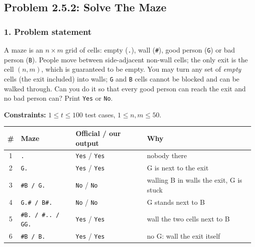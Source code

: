 \subsection{Problem 2.5.2: Solve The Maze}

\newcommand{\gptworow}[2]{\foreach \s/\t [count=\c from 0] in {#2} \node[g2p5-\s] at (\c,-#1) {\t};}


\subsubsection*{1. Problem statement}

A maze is an $n \times m$ grid of cells: empty (\texttt{.}), wall (\texttt{\#}), good person (\texttt{G}) or bad person (\texttt{B}). People move between side-adjacent non-wall cells; the only exit is the cell $(n, m)$, which is guaranteed to be empty. You may turn any set of \emph{empty} cells (the exit included) into walls; \texttt{G} and \texttt{B} cells cannot be blocked and can be walked through. Can you do it so that every good person can reach the exit and no bad person can? Print \texttt{Yes} or \texttt{No}.

\textbf{Constraints:} $1 \le t \le 100$ test cases, $1 \le n, m \le 50$.

\begin{table}[H]
\centering\small
\begin{tabular}{@{}clll@{}}
\toprule
\textbf{\#} & \textbf{Maze} & \textbf{Official / our output} & \textbf{Why} \\
\midrule
1 & \texttt{.} & \texttt{Yes} / \texttt{Yes} & nobody there \\
2 & \texttt{G.} & \texttt{Yes} / \texttt{Yes} & G is next to the exit \\
3 & \texttt{\#B / G.} & \texttt{No} / \texttt{No} & walling B in walls the exit, G is stuck \\
4 & \texttt{G.\# / B\#.} & \texttt{No} / \texttt{No} & G stands next to B \\
5 & \texttt{\#B. / \#.. / GG.} & \texttt{Yes} / \texttt{Yes} & wall the two cells next to B \\
6 & \texttt{\#B / B.} & \texttt{Yes} / \texttt{Yes} & no G: wall the exit itself \\
\bottomrule
\end{tabular}
\end{table}

